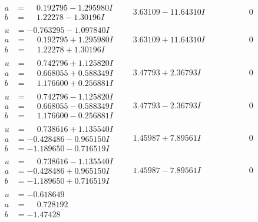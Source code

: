 \documentclass[1p]{elsarticle_modified}
\theoremstyle{definition}
\begin{document}
$$\begin{array}{c|c|c}
\begin{aligned}
a &= \phantom{-}0.192795 - 1.295980 I \\
b &= \phantom{-}1.22278 - 1.30196 I\end{aligned}
 & \phantom{-}3.63109 - 11.64310 I & \phantom{-0.000000 } 0 \\ \hline\begin{aligned}
u &= -0.763295 - 1.097840 I \\
a &= \phantom{-}0.192795 + 1.295980 I \\
b &= \phantom{-}1.22278 + 1.30196 I\end{aligned}
 & \phantom{-}3.63109 + 11.64310 I & \phantom{-0.000000 } 0 \\ \hline\begin{aligned}
u &= \phantom{-}0.742796 + 1.125820 I \\
a &= \phantom{-}0.668055 + 0.588349 I \\
b &= \phantom{-}1.176600 + 0.256881 I\end{aligned}
 & \phantom{-}3.47793 + 2.36793 I & \phantom{-0.000000 } 0 \\ \hline\begin{aligned}
u &= \phantom{-}0.742796 - 1.125820 I \\
a &= \phantom{-}0.668055 - 0.588349 I \\
b &= \phantom{-}1.176600 - 0.256881 I\end{aligned}
 & \phantom{-}3.47793 - 2.36793 I & \phantom{-0.000000 } 0 \\ \hline\begin{aligned}
u &= \phantom{-}0.738616 + 1.135540 I \\
a &= -0.428486 - 0.965150 I \\
b &= -1.189650 - 0.716519 I\end{aligned}
 & \phantom{-}1.45987 + 7.89561 I & \phantom{-0.000000 } 0 \\ \hline\begin{aligned}
u &= \phantom{-}0.738616 - 1.135540 I \\
a &= -0.428486 + 0.965150 I \\
b &= -1.189650 + 0.716519 I\end{aligned}
 & \phantom{-}1.45987 - 7.89561 I & \phantom{-0.000000 } 0 \\ \hline\begin{aligned}
u &= -0.618649\phantom{ +0.000000I} \\
a &= \phantom{-}0.728192\phantom{ +0.000000I} \\
b &= -1.47428\phantom{ +0.000000I}\end{aligned}

\end{array}$$
\end{document}
